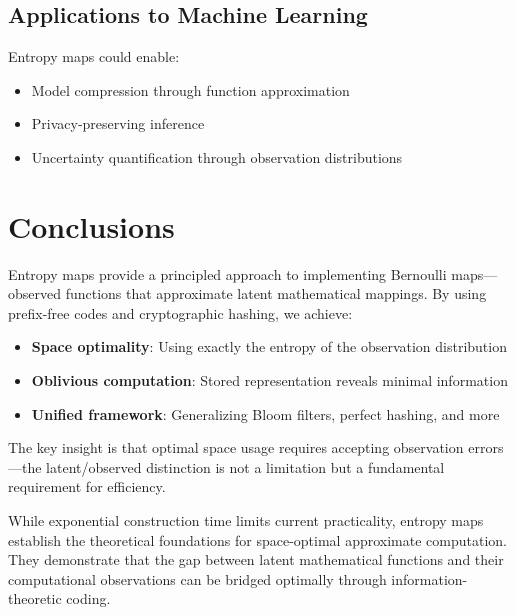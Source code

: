 \documentclass[11pt,final,hidelinks]{article}
\begin{document}
\subsection{Applications to Machine Learning}

Entropy maps could enable:
\begin{itemize}
    \item Model compression through function approximation
    \item Privacy-preserving inference
    \item Uncertainty quantification through observation distributions
\end{itemize}

\section{Conclusions}

Entropy maps provide a principled approach to implementing Bernoulli maps—observed functions that approximate latent mathematical mappings. By using prefix-free codes and cryptographic hashing, we achieve:

\begin{itemize}
    \item \textbf{Space optimality}: Using exactly the entropy of the observation distribution
    \item \textbf{Oblivious computation}: Stored representation reveals minimal information
    \item \textbf{Unified framework}: Generalizing Bloom filters, perfect hashing, and more
\end{itemize}

The key insight is that optimal space usage requires accepting observation errors—the latent/observed distinction is not a limitation but a fundamental requirement for efficiency.

While exponential construction time limits current practicality, entropy maps establish the theoretical foundations for space-optimal approximate computation. They demonstrate that the gap between latent mathematical functions and their computational observations can be bridged optimally through information-theoretic coding.




\end{document}
